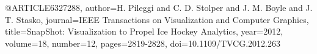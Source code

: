 @ARTICLE{6327288,
  author={H. {Pileggi} and C. D. {Stolper} and J. M. {Boyle} and J. T. {Stasko}},
  journal={IEEE Transactions on Visualization and Computer Graphics}, 
  title={SnapShot: Visualization to Propel Ice Hockey Analytics}, 
  year={2012},
  volume={18},
  number={12},
  pages={2819-2828},
  doi={10.1109/TVCG.2012.263}}